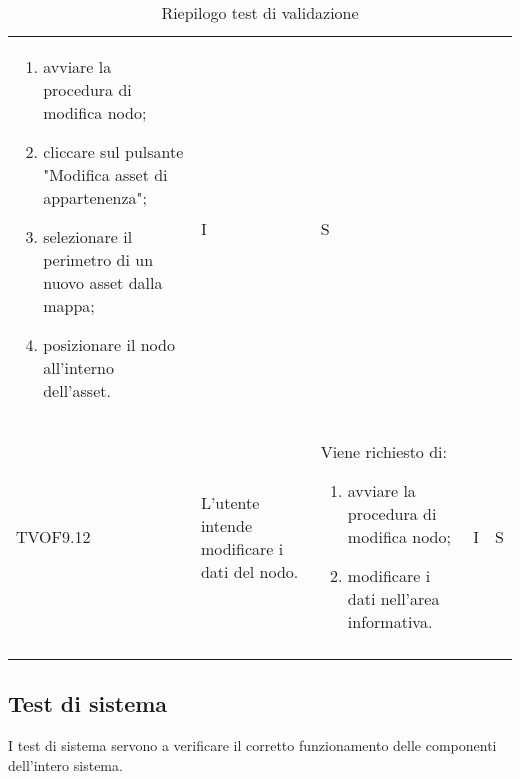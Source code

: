 \begin{longtable}{p{1.8cm}!{\VRule[1pt]}p{3.5cm}!{\VRule[1pt]}p{5.5cm}!{\VRule[1pt]}p{1cm}!{\VRule[1pt]}p{1cm}}
\begin{enumerate}
		\item avviare la procedura di modifica nodo; 
		\item cliccare sul pulsante "Modifica asset di appartenenza"; 
		\item selezionare il perimetro di un nuovo asset dalla mappa; 
		\item posizionare il nodo all'interno dell'asset. 
	\end{enumerate} & I & S \\ 
	TVOF9.12 & L'utente intende modificare i dati del nodo. & Viene richiesto di: \begin{enumerate} 
		\item avviare la procedura di modifica nodo; 
		\item modificare i dati nell'area informativa. 
	\end{enumerate} & I & S \\ 
	\caption{Riepilogo test di validazione}
\end{longtable}

	\subsection{Test di sistema}
		I test di sistema servono a verificare il corretto funzionamento delle componenti dell'intero sistema.
		
